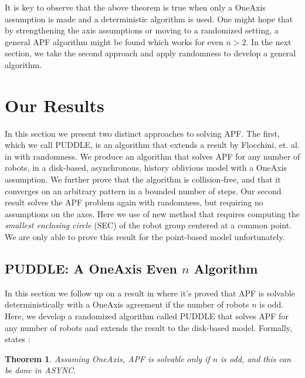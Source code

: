 \documentclass[preprint,10pt]{elsarticle}
\newtheorem{theorem}{Theorem}
\begin{document}
	It is key to observe that the above theorem is true when only a OneAxis assumption is made and 
	a deterministic algorithm is used. One might hope that by strengthening the axis assumptions or
	moving to a randomized setting, a general APF algorithm might be found which works for even
	$n > 2$. In the next section, we take the second approach and apply randomness to develop
	a general algorithm.

\section{Our Results}
\label{ourRes}
	In this section we present two distinct approaches to solving APF. The first, which we call PUDDLE, is 
	an algorithm that extends a result by Flocchini, et. al. in \cite{flocchini08arbitrary} with randomness.
	We produce an algorithm that solves APF for any number of robots, in a disk-based, asynchronous, history
	oblivious model with a OneAxis assumption. We further prove that the algorithm is collision-free, and
	that it converges on an arbitrary pattern in a bounded number of steps. 
	Our second result solves the APF problem again with randomness, but requiring no assumptions on the axes.
	Here we use of new method that requires computing the \textit{smallest enclosing circle} (SEC) of
	the robot group centered at a common point. We are only able to prove this result for the point-based
	model unfortunately.


\subsection{PUDDLE: A OneAxis Even $n$ Algorithm } 
	In this section we follow up on a result in \cite{flocchini12distrib} where it's proved that
	APF is solvable deterministically with a OneAxis agreement if the number of robots $n$ is
	odd. Here, we develop a randomized algorithm called PUDDLE that solves APF for any number of robots
	and extends the result to the disk-based model. Formally, \cite{flocchini12distrib} states :
	\begin{theorem} 
		Assuming OneAxis, APF is solvable only if $n$ is odd, and this can be done in ASYNC.
	\end{theorem} 
\end{document}
